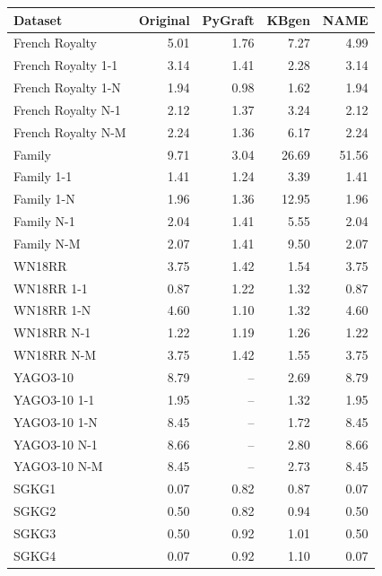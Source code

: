 \begin{tabular}{lrrrr}
\toprule
Dataset & Original & PyGraft & KBgen & NAME \\
\midrule
French Royalty & 5.01 & 1.76 & 7.27 & 4.99 \\
French Royalty 1-1 & 3.14 & 1.41 & 2.28 & 3.14 \\
French Royalty 1-N & 1.94 & 0.98 & 1.62 & 1.94 \\
French Royalty N-1 & 2.12 & 1.37 & 3.24 & 2.12 \\
French Royalty N-M & 2.24 & 1.36 & 6.17 & 2.24 \\
\midrule
Family & 9.71 & 3.04 & 26.69 & 51.56 \\
Family 1-1 & 1.41 & 1.24 & 3.39 & 1.41 \\
Family 1-N & 1.96 & 1.36 & 12.95 & 1.96 \\
Family N-1 & 2.04 & 1.41 & 5.55 & 2.04 \\
Family N-M & 2.07 & 1.41 & 9.50 & 2.07 \\
\midrule
WN18RR & 3.75 & 1.42 & 1.54 & 3.75 \\
WN18RR 1-1 & 0.87 & 1.22 & 1.32 & 0.87 \\
WN18RR 1-N & 4.60 & 1.10 & 1.32 & 4.60 \\
WN18RR N-1 & 1.22 & 1.19 & 1.26 & 1.22 \\
WN18RR N-M & 3.75 & 1.42 & 1.55 & 3.75 \\
\midrule
YAGO3-10 & 8.79 & – & 2.69 & 8.79 \\
YAGO3-10 1-1 & 1.95 & – & 1.32 & 1.95 \\
YAGO3-10 1-N & 8.45 & – & 1.72 & 8.45 \\
YAGO3-10 N-1 & 8.66 & – & 2.80 & 8.66 \\
YAGO3-10 N-M & 8.45 & – & 2.73 & 8.45 \\
\midrule
SGKG1 & 0.07 & 0.82 & 0.87 & 0.07 \\
SGKG2 & 0.50 & 0.82 & 0.94 & 0.50 \\
SGKG3 & 0.50 & 0.92 & 1.01 & 0.50 \\
SGKG4 & 0.07 & 0.92 & 1.10 & 0.07 \\
\bottomrule
\end{tabular}
